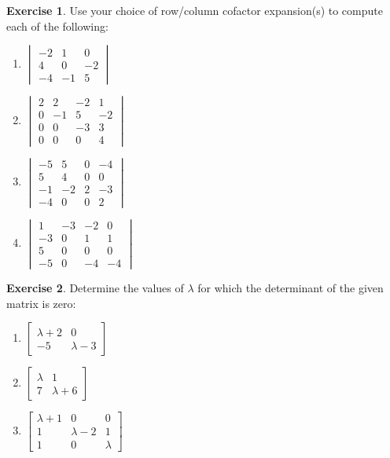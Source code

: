 \documentclass[handout]{beamer}
\newcommand{\fn}{\insertframenumber}
\theoremstyle{definition}
\newtheorem{exercise}{Exercise}
\begin{document}
\begin{frame}{\fn}
	\begin{exercise}
		Use your choice of row/column cofactor expansion(s) to compute each of the following:
		\begin{multicols}{2}
			\begin{enumerate}[label=(\alph*)]
			\item $\begin{vmatrix}
			-2 & 1 & 0 \\
			4 & 0 & -2 \\
			-4 & -1 & 5
			\end{vmatrix}$
			\item $\begin{vmatrix}
			2 & 2 & -2 & 1 \\
			0 & -1 & 5 & -2 \\
			0 & 0 & -3 & 3 \\
			0 & 0 & 0 & 4
			\end{vmatrix}$
			\item $\begin{vmatrix}
				-5 & 5 & 0 & -4 \\
				5 & 4 & 0 & 0 \\
				-1 & -2 & 2 & -3 \\
				-4 & 0 & 0 & 2
			\end{vmatrix}$
			\item $\begin{vmatrix}
			1 & -3 & -2 & 0 \\
			-3 & 0 & 1 & 1 \\
			5 & 0 & 0 & 0 \\
			-5 & 0 & -4 & -4
			\end{vmatrix}$
		\end{enumerate}
		\end{multicols}
	\end{exercise}
\end{frame}
\begin{frame}{\fn}
	\begin{exercise}
		Determine the values of $\lambda$ for which the determinant of the given matrix is zero:
			\begin{enumerate}[label=(\alph*)]
				\item $\begin{bmatrix}
				\lambda+2&0\\-5&\lambda-3
				\end{bmatrix}$
				\item $\begin{bmatrix}
					\lambda&1\\7&\lambda+6
				\end{bmatrix}$
				\item $\begin{bmatrix}
				\lambda+1 & 0 & 0 \\
				1 & \lambda-2 & 1 \\
				1 & 0 & \lambda
				\end{bmatrix}$
			\end{enumerate}
	\end{exercise}
\end{frame}
\end{document}
